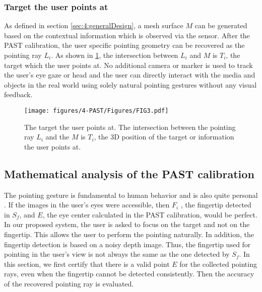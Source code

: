 \subsubsection{Target the user points at} \label{sec:4:findTarget}
As defined in section \ref{sec:4:generalDesign}, {a mesh surface $M$ can be generated based on the contextual information which is observed via the sensor.}
After the PAST calibration, the user specific pointing geometry can be recovered as the pointing ray $L_{i}$. 
As shown in \figurename{ \ref{fig:pointToTarget}}, the intersection between $L_{i}$ and $M$ is $T_i$, the target which the user points at. No additional camera or marker is used to track the user's eye gaze or head and the user can directly interact with the media and objects in the real world using solely natural pointing gestures without any visual feedback. 
\begin{figure} 
	\centering
	\texttt{[image: figures/4-PAST/Figures/FIG3.pdf]}
	\caption{The target the user points at. The intersection between the pointing ray $L_{i}$ and the $M$ is $T_i$, the 3D position of the target or information the user points at.}
	\label{fig:pointToTarget}
\end{figure}
\subsection{Mathematical analysis of the PAST calibration}
The pointing gesture is fundamental to human behavior and is also quite personal \citep{Matthews2012}. If the images in the user's eyes were accessible, then $F_i$ , the fingertip detected in $S_f$, and $E$, the eye center calculated in the PAST calibration, would be perfect. 
In our proposed system, the user is asked to focus on the target and not on the fingertip. This allows the user to perform the pointing naturally.
In addition, the fingertip detection is based on a noisy depth image.
Thus, the fingertip used for pointing in the user's view is not always the same as the one detected by $S_f$. 
In this section, we first certify that there is a valid point $E$ for the collected pointing rays, even when the fingertip cannot be detected consistently. Then the accuracy of the recovered pointing ray is evaluated.

